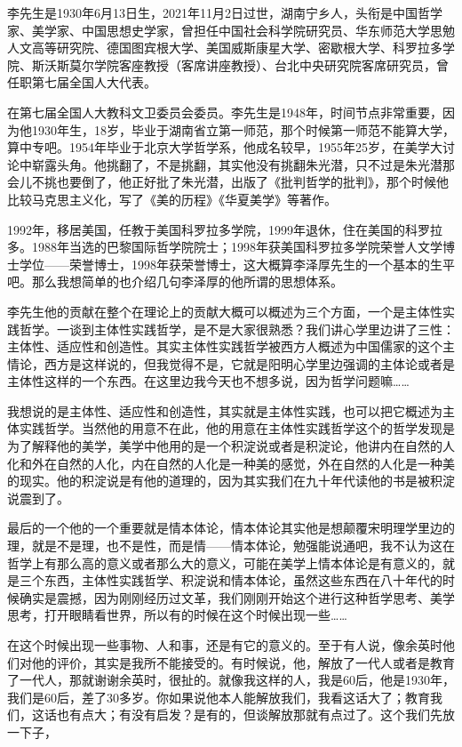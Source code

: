 \documentclass[UTF8, 12pt, a4paper]{ctexrep}
\begin{document}
李先生是1930年6月13日生，2021年11月2日过世，湖南宁乡人，头衔是中国哲学家、美学家、中国思想史学家，曾担任中国社会科学院研究员、华东师范大学思勉人文高等研究院、德国图宾根大学、美国威斯康星大学、密歇根大学、科罗拉多学院、斯沃斯莫尔学院客座教授（客席讲座教授）、台北中央研究院客席研究员，曾任职第七届全国人大代表。

在第七届全国人大教科文卫委员会委员。李先生是1948年，时间节点非常重要，因为他1930年生，18岁，毕业于湖南省立第一师范，那个时候第一师范不能算大学，算中专吧。1954年毕业于北京大学哲学系，他成名较早，1955年25岁，在美学大讨论中崭露头角。他挑翻了，不是挑翻，其实他没有挑翻朱光潜，只不过是朱光潜那会儿不挑也要倒了，他正好批了朱光潜，出版了《批判哲学的批判》，那个时候他比较马克思主义化，写了《美的历程》《华夏美学》等著作。

1992年，移居美国，任教于美国科罗拉多学院，1999年退休，住在美国的科罗拉多。1988年当选的巴黎国际哲学院院士；1998年获美国科罗拉多学院荣誉人文学博士学位——荣誉博士，1998年获荣誉博士，这大概算李泽厚先生的一个基本的生平吧。那么我想简单的也介绍几句李泽厚的他所谓的思想体系。

李先生他的贡献在整个在理论上的贡献大概可以概述为三个方面，一个是主体性实践哲学。一谈到主体性实践哲学，是不是大家很熟悉？我们讲心学里边讲了三性：主体性、适应性和创造性。其实主体性实践哲学被西方人概述为中国儒家的这个主情论，西方是这样说的，但我觉得不是，它就是阳明心学里边强调的主体论或者是主体性这样的一个东西。在这里边我今天也不想多说，因为哲学问题嘛……

我想说的是主体性、适应性和创造性，其实就是主体性实践，也可以把它概述为主体实践哲学。当然他的用意不在此，他的用意在主体性实践哲学这个的哲学发现是为了解释他的美学，美学中他用的是一个积淀说或者是积淀论，他讲内在自然的人化和外在自然的人化，内在自然的人化是一种美的感觉，外在自然的人化是一种美的现实。他的积淀说是有他的道理的，因为其实我们在九十年代读他的书是被积淀说震到了。

最后的一个他的一个重要就是情本体论，情本体论其实他是想颠覆宋明理学里边的理，就是不是理，也不是性，而是情——情本体论，勉强能说通吧，我不认为这在哲学上有那么高的意义或者那么大的意义，可能在美学上情本体论是有意义的，就是三个东西，主体性实践哲学、积淀说和情本体论，虽然这些东西在八十年代的时候确实是震撼，因为刚刚经历过文革，我们刚刚开始这个进行这种哲学思考、美学思考，打开眼睛看世界，所以有的时候在这个时候出现一些……

在这个时候出现一些事物、人和事，还是有它的意义的。至于有人说，像余英时他们对他的评价，其实是我所不能接受的。有时候说，他，解放了一代人或者是教育了一代人，那就谢谢余英时，很扯的。就像我这样的人，我是60后，他是1930年，我们是60后，差了30多岁。你如果说他本人能解放我们，我看这话大了；教育我们，这话也有点大；有没有启发？是有的，但谈解放那就有点过了。这个我们先放一下子，
\end{document}

